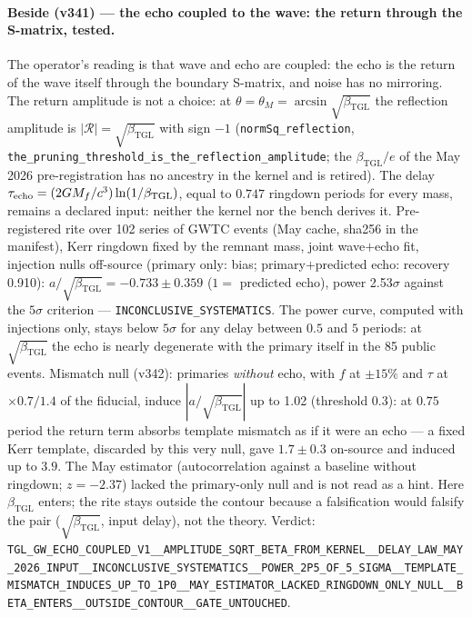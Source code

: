 \documentclass[11pt]{article}
\newcommand{\bTGL}{\beta_{\mathrm{TGL}}}\newcommand{\Msun}{M_{\odot}}\newcommand{\TGL}{\mathrm{TGL}}
\theoremstyle{definition}\newtheorem{deriv}{Derivation}
\begin{document}
\paragraph*{Beside (v341) --- the echo coupled to the wave: the return through the S-matrix, tested.} The operator's reading is that wave and echo are coupled: the echo is the return of the wave itself through the boundary S-matrix, and noise has no mirroring. The return amplitude is not a choice: at $\theta=\theta_M=\arcsin\sqrt{\bTGL}$ the reflection amplitude is $|\mathcal R|=\sqrt{\bTGL}$ with sign $-1$ (\texttt{normSq\_reflection}, \texttt{the\_pruning\_threshold\_is\_the\_reflection\_amplitude}; the $\bTGL/e$ of the May 2026 pre-registration has no ancestry in the kernel and is retired). The delay $\tau_{\rm echo}=(2GM_f/c^3)\ln(1/\bTGL)$, equal to $0.747$ ringdown periods for every mass, remains a declared input: neither the kernel nor the bench derives it. Pre-registered rite over 102 series of GWTC events (May cache, sha256 in the manifest), Kerr ringdown fixed by the remnant mass, joint wave$+$echo fit, injection nulls off-source (primary only: bias; primary$+$predicted echo: recovery 0.910): $a/\sqrt{\bTGL}=-0.733\pm0.359$ ($1=$ predicted echo), power 2.53$\sigma$ against the $5\sigma$ criterion --- \texttt{INCONCLUSIVE\_SYSTEMATICS}. The power curve, computed with injections only, stays below $5\sigma$ for any delay between $0.5$ and $5$ periods: at $\sqrt{\bTGL}$ the echo is nearly degenerate with the primary itself in the 85 public events. Mismatch null (v342): primaries \emph{without} echo, with $f$ at $\pm15\%$ and $\tau$ at $\times0.7/1.4$ of the fiducial, induce $|a/\sqrt{\bTGL}|$ up to 1.02 (threshold $0.3$): at $0.75$ period the return term absorbs template mismatch as if it were an echo --- a fixed Kerr template, discarded by this very null, gave $1.7\pm0.3$ on-source and induced up to $3.9$. The May estimator (autocorrelation against a baseline without ringdown; $z=-2.37$) lacked the primary-only null and is not read as a hint. Here $\bTGL$ enters; the rite stays outside the contour because a falsification would falsify the pair ($\sqrt{\bTGL}$, input delay), not the theory. Verdict: \texttt{TGL\_GW\_ECHO\_COUPLED\_V1\_\_AMPLITUDE\_SQRT\_BETA\_FROM\_KERNEL\_\_DELAY\_LAW\_MAY\_2026\_INPUT\_\_INCONCLUSIVE\_SYSTEMATICS\_\_POWER\_2P5\_OF\_5\_SIGMA\_\_TEMPLATE\_MISMATCH\_INDUCES\_UP\_TO\_1P0\_\_MAY\_ESTIMATOR\_LACKED\_RINGDOWN\_ONLY\_NULL\_\_BETA\_ENTERS\_\_OUTSIDE\_CONTOUR\_\_GATE\_UNTOUCHED}.
\end{document}
